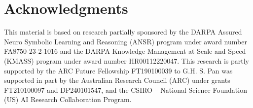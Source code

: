 \section*{Acknowledgments}
This material is based on research partially sponsored by the DARPA Assured Neuro Symbolic Learning and Reasoning (ANSR) program under award number FA8750-23-2-1016 and the DARPA Knowledge Management at Scale and Speed (KMASS) program under award number HR00112220047. This research is partly supported by the ARC Future Fellowship FT190100039 to G.H. S. Pan was supported in part by the Australian Research Council (ARC) under grants FT210100097 and DP240101547, and the CSIRO – National Science Foundation (US) AI Research Collaboration Program.